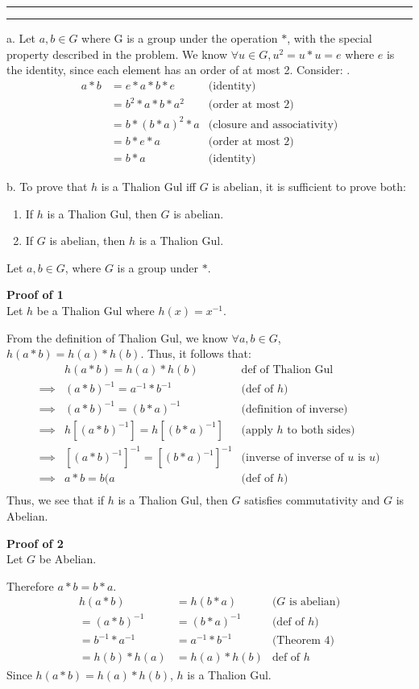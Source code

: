 \documentclass[11pt]{article}
\newcounter{questionCounter}
\newcounter{partCounter}[questionCounter]
\newenvironment{question}[2][\arabic{questionCounter}]{%
    \setcounter{partCounter}{0}%
    \vspace{.25in} \hrule \vspace{0.5em}%
        \noindent{\bf #2}%
    \vspace{0.8em} \hrule \vspace{.10in}%
    \addtocounter{questionCounter}{1}%
}{}
\begin{document}
\begin{question}{Battle of the Hornburg}
a. Let $a,b \in G$ where G is a group under the operation $*$, with the 
special property described in the problem.
We know $\forall u \in G, u^2 = u*u = e$ where $e$ is the identity, 
since each element has an order of at most 2. Consider:
. \begin{align*}
a*b &= e*a*b*e & \text{(identity)}\\
    &= b^2*a*b*a^2 & \text{(order at most 2)}\\
    &= b*(b*a)^2*a & \text{(closure and associativity)}\\
    &= b*e*a & \text{(order at most 2)}\\
    &= b*a & \text{(identity)}
    \end{align*}

b.
To prove that $h$ is a Thalion Gul iff $G$ is abelian, it is sufficient
to prove both:
\begin{enumerate}
\item If $h$ is a Thalion Gul, then $G$ is abelian.
\item If $G$ is abelian, then $h$ is a Thalion Gul.
\end{enumerate}

Let $a,b \in G$, where $G$ is a group under $*$.

\textbf{Proof of 1}\\
Let $h$ be a Thalion Gul where $h(x) = x^{-1}$.

From the definition of Thalion Gul, we know $\forall a,b \in G$,
$h(a*b) = h(a) * h(b)$. Thus, it follows that:
\begin{align*}
            &h(a*b) = h(a) * h(b)        &\text{def of Thalion Gul}\\
\implies    &(a*b)^{-1} = a^{-1} * b^{-1}    &\text{(def of $h$)}\\
\implies    &(a*b)^{-1} = (b*a)^{-1}          &\text{(definition of inverse)}\\
\implies    &h[(a*b)^{-1}] = h[(b*a)^{-1}]        &\text{(apply $h$ to both sides)}\\
\implies    &[(a*b)^{-1}]^{-1} = [(b*a)^{-1}]^{-1}        &\text{(inverse of inverse of $u$ is $u$)}\\
\implies    &a*b = b(a                        &\text{(def of $h$)}\\
\end{align*}
Thus, we see that if $h$ is a Thalion Gul, then $G$ satisfies commutativity and $G$ is Abelian.

\textbf{Proof of 2}\\
Let $G$ be Abelian.

Therefore $a*b = b*a$.
\begin{align*}
 h(a*b) &= h(b*a)        &\text{($G$ is abelian)}\\
=(a*b)^{-1} &= (b*a)^{-1}    &\text{(def of $h$)}\\
=b^{-1} * a^{-1} &= a^{-1} * b^{-1}   &\text{(Theorem 4)}\\
=h(b) * h(a) &= h(a) * h(b) &\text{def of $h$}
\end{align*}
Since $h(a*b) = h(a) * h(b)$, $h$ is a Thalion Gul.
\end{question}
\end{document}
